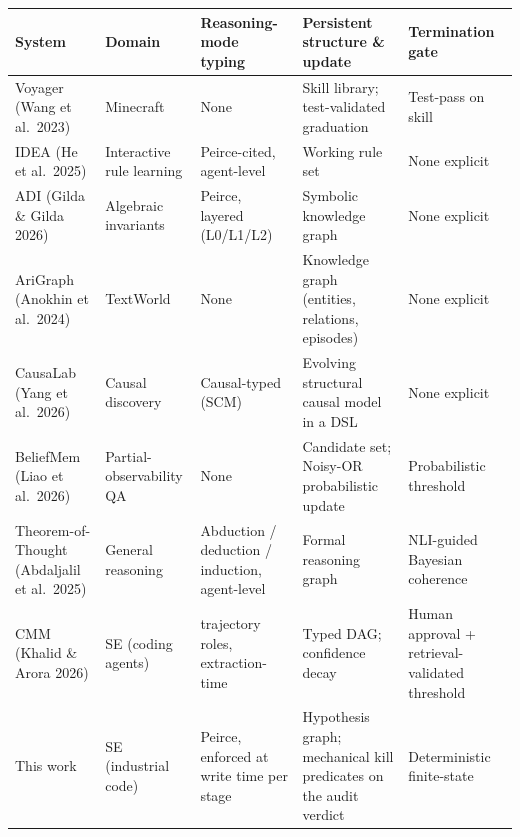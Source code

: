 \documentclass[
  10pt,
]{article}
\newcounter{none} %
\begin{document}
{\def\LTcaptype{none} %
\begin{longtable}[]{@{}
  >{\raggedright\arraybackslash}p{}
  >{\raggedright\arraybackslash}p{}
  >{\raggedright\arraybackslash}p{}
  >{\raggedright\arraybackslash}p{}
  >{\raggedright\arraybackslash}p{}@{}}
\toprule\noalign{}
\begin{minipage}[b]{\linewidth}\raggedright
System
\end{minipage} & \begin{minipage}[b]{\linewidth}\raggedright
Domain
\end{minipage} & \begin{minipage}[b]{\linewidth}\raggedright
Reasoning-mode typing
\end{minipage} & \begin{minipage}[b]{\linewidth}\raggedright
Persistent structure \& update
\end{minipage} & \begin{minipage}[b]{\linewidth}\raggedright
Termination gate
\end{minipage} \\
\midrule\noalign{}
\endhead
\bottomrule\noalign{}
\endlastfoot
Voyager (Wang et al.~2023) & Minecraft & None & Skill library;
test-validated graduation & Test-pass on skill \\
IDEA (He et al.~2025) & Interactive rule learning & Peirce-cited,
agent-level & Working rule set & None explicit \\
ADI (Gilda \& Gilda 2026) & Algebraic invariants & Peirce, layered
(L0/L1/L2) & Symbolic knowledge graph & None explicit \\
AriGraph (Anokhin et al.~2024) & TextWorld & None & Knowledge graph
(entities, relations, episodes) & None explicit \\
CausaLab (Yang et al.~2026) & Causal discovery & Causal-typed (SCM) &
Evolving structural causal model in a DSL & None explicit \\
BeliefMem (Liao et al.~2026) & Partial-observability QA & None &
Candidate set; Noisy-OR probabilistic update & Probabilistic
threshold \\
Theorem-of-Thought (Abdaljalil et al.~2025) & General reasoning &
Abduction / deduction / induction, agent-level & Formal reasoning graph
& NLI-guided Bayesian coherence \\
CMM (Khalid \& Arora 2026) & SE (coding agents) & 7 trajectory roles,
extraction-time & Typed DAG; confidence decay & Human approval +
retrieval-validated threshold \\
This work & SE (industrial code) & Peirce, enforced at write time per
stage & Hypothesis graph; mechanical kill predicates on the audit
verdict & Deterministic finite-state \\
\end{longtable}
}
\end{document}
